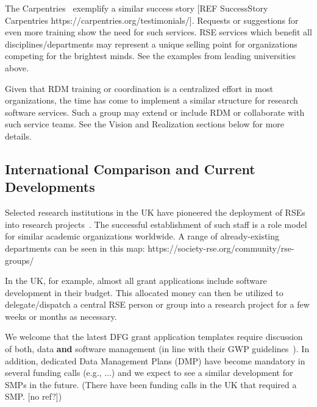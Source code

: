 \documentclass[a4paper]{article}
\begin{document}
The Carpentries~\autocite{Carpentries} exemplify a similar success story [REF SuccessStory Carpentries https://carpentries.org/testimonials/]. Requests or suggestions for even more training show the need for such services.
RSE services which benefit all disciplines/departments may represent a unique selling point for organizations competing for the brightest minds.
See the examples from leading universities above.

Given that RDM training or coordination is a centralized effort in most organizations, the time has come to implement a similar structure for research software services.
Such a group may extend or include RDM or collaborate with such service teams.
See the Vision and Realization sections below for more details.

\subsection{International Comparison and Current Developments}


Selected research institutions in the UK have pioneered the deployment of RSEs into research projects~\autocite{Crouch2013}. The successful establishment of such staff is a role model for similar academic organizations worldwide.
A range of already-existing departments can be seen in this map: https://society-rse.org/community/rse-groups/

In the UK, for example, almost all grant applications include software development in their budget.
This allocated money can then be utilized to delegate/dispatch a central RSE person or group into a research project for a few weeks or months as necessary.

We welcome that the latest DFG grant application templates require discussion of both, data \textbf{and} software management (in line with their GWP guidelines~\autocite{dfg_gsp}).
In addition, dedicated Data Management Plans (DMP) have become mandatory in several funding calls (e.g., ...) and we expect to see a similar development for SMPs in the future. (There have been funding calls in the UK that required a SMP. [no ref?]) 
\end{document}
